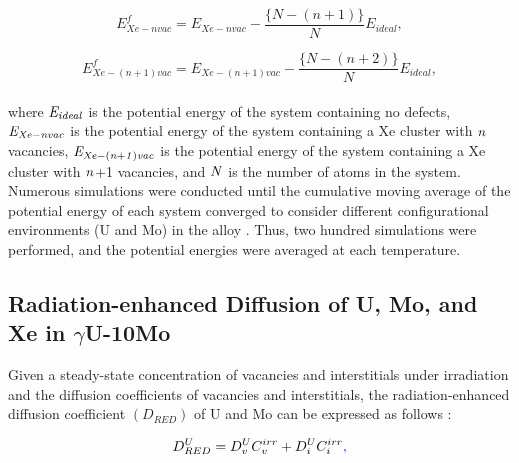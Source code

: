\documentclass[preprint,12pt]{elsarticle}
\providecommand{\DIFadd}[1]{{\protect\color{blue} \sf #1}} %
\providecommand{\DIFaddbegin}{} %
\providecommand{\DIFaddend}{} %
\newcommand{\DIFaddincludegraphics}[2][]{{\color{blue}\fbox{\DIFOincludegraphics[#1]{#2}}}} %
\DeclareRobustCommand{\DIFaddbegin}{\DIFOaddbegin \let\includegraphics\DIFaddincludegraphics} %
\DeclareRobustCommand{\DIFaddend}{\DIFOaddend \let\includegraphics\DIFOincludegraphics} %
\begin{document}
\begin{equation}
\label{eq:eform1}
E_{Xe-nvac}^{f} = E_{Xe-nvac} - \frac{\{N-(n+1)\}}{N}E_{ideal}, 
\end{equation}

\begin{equation}
\label{eq:eform2}
E_{Xe-(n+1)vac}^{f} = E_{Xe-(n+1)vac} - \frac{\{N-(n+2)\}}{N}E_{ideal}, 
\end{equation}
\\
\noindent where $\it{E}_{ideal}$ is the potential energy of the system containing no defects, $\it{E}_{Xe-nvac}$ is the potential energy of the system containing a Xe cluster with $\it{n}$ vacancies, $\it{E}_{Xe-(n+1)vac}$ is the potential energy of the system containing a Xe cluster with $\it{n}$+1 vacancies, and $\it{N}$ is the number of atoms in the system. Numerous simulations were conducted until the cumulative moving average of the potential energy of each system converged \DIFaddbegin \DIFadd{to consider different configurational environments (U and Mo) in the alloy }\DIFaddend \cite{park2021atomistic}. Thus, two hundred simulations were performed, and the potential energies were averaged at each temperature.
\DIFaddbegin \\
\DIFaddend 

\subsection{Radiation-enhanced Diffusion of U, Mo, and Xe in $\gamma$U-10Mo}
Given a steady-state concentration of vacancies and interstitials under irradiation and the diffusion coefficients of vacancies and interstitials, the radiation-enhanced diffusion coefficient $(D_{RED})$ of U and Mo can be expressed as \DIFaddbegin \DIFadd{follows \cite{was2016fundamentals}}\DIFaddend :

\begin{equation}
D_{RED}^{U}= D_{v}^{U}C_{v}^{irr} + D_{i}^{U}C_{i}^{irr}\DIFaddbegin \DIFadd{,
}\DIFaddend \end{equation}
\end{document}
